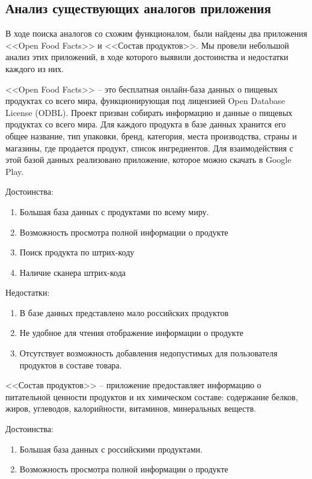 \subsection{Анализ существующих аналогов приложения}

В ходе поиска аналогов со схожим функционалом, были найдены два приложения <<Open Food Facts>> и <<Состав продуктов>>. Мы провели небольшой анализ этих приложений, в ходе которого выявили достоинства и недостатки каждого из них.

<<Open Food Facts>> -- это бесплатная онлайн-база данных о пищевых продуктах со всего мира, функционирующая под лицензией Open Database License (ODBL). Проект призван собирать информацию и данные о пищевых продуктах со всего мира. Для каждого продукта в базе данных хранится его общее название, тип упаковки, бренд, категория, места производства, страны и магазины, где продается продукт, список ингредиентов. Для взаимодействия с этой базой данных реализовано приложение, которое можно скачать в Google Play.
\newline
  
Достоинства:
\begin{enumerate}
	\item Большая база данных с продуктами по всему миру.
	\item Возможность просмотра полной информации о продукте
	\item Поиск продукта по штрих-коду
	\item Наличие сканера штрих-кода 
\end{enumerate}

Недостатки:
\begin{enumerate}
	\item В базе данных представлено мало российских продуктов  
	\item Не удобное для чтения отображение информации о продукте
	\item Отсутствует возможность добавления недопустимых для пользователя продуктов в составе товара.
\end{enumerate}

<<Состав продуктов>> -- приложение предоставляет информацию о питательной ценности продуктов и их химическом составе: содержание белков, жиров, углеводов, калорийности, витаминов, минеральных веществ.

Достоинства:
\begin{enumerate}
	\item Большая база данных с российскими продуктами.
	\item Возможность просмотра полной информации о продукте
\end{enumerate}

